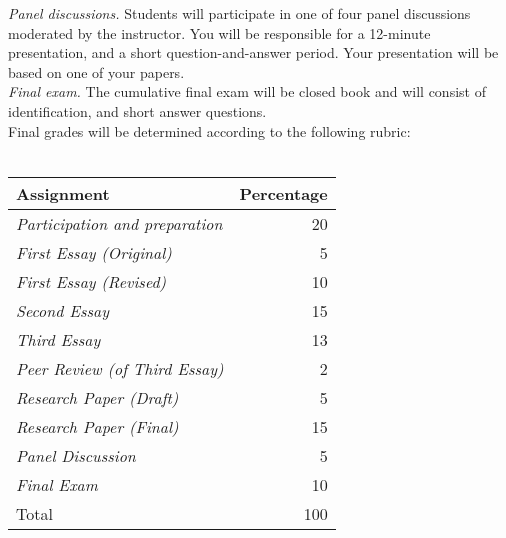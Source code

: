 \documentclass [11pt]{article}
\begin{document}
\emph{Panel discussions.} Students will participate in one of four panel discussions moderated by the instructor. You will be responsible for a 12-minute presentation, and a short question-and-answer period. Your presentation will be based on one of your papers.\\

\emph{Final exam.} The cumulative final exam will be closed book and will consist of identification, and short answer questions. \\

Final grades will be determined according to the following rubric: \\
\ \\
\begin{tabular}{ l r }
\hline
  {\bf Assignment}                     & Percentage  \\
                      
\hline \hline

\emph{Participation and preparation}           & 20 \\
                          
\emph{First Essay (Original)}                  & 5  \\
                                                   
\emph{First Essay (Revised)}                   & 10 \\                      

\emph{Second Essay}                            & 15 \\
                          
\emph{Third Essay}                             & 13 \\
                                         
\emph{Peer Review (of Third Essay)}            & 2  \\
                      
\emph{Research Paper (Draft)}                  & 5  \\
                          
\emph{Research Paper (Final)}                  & 15 \\
                                                               
\emph{Panel Discussion}                        & 5  \\
     
\emph{Final Exam}                              & 10 \\
                          
\hline
Total                                          & 100 \\
\hline
\end{tabular} \\
\end{document}
